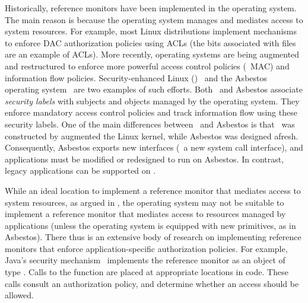 Historically, reference monitors have been implemented in the operating system.
The main reason is because the operating system manages and mediates access to
system resources. For example, most Linux distributions implement mechanisms to
enforce DAC authorization policies using ACLs (the  bits associated
with files are an example of ACLs). More recently, operating systems are being
augmented and restructured to enforce more powerful access control policies
(\eg~MAC) and information flow policies. Security-enhanced Linux
(\selinux)~\cite{ls01a,ls01b} and the Asbestos operating
system~\cite{ekv+05,kef+05} are two examples of such efforts. Both \selinux\
and Asbestos associate \textit{security labels} with subjects and objects
managed by the operating system. They enforce mandatory access control policies
and track information flow using these security labels. One of the main
differences between \selinux\ and Asbestos is that \selinux\ was constructed by
augmented the Linux kernel, while Asbestos was designed afresh. Consequently,
Asbestos exports new interfaces (\eg~a new system call interface), and
applications must be modified or redesigned to run on Asbestos. In contrast,
legacy applications can be supported on \selinux.

While an ideal location to implement a reference monitor that mediates access
to system resources, as argued in
, the operating
system may not be suitable to implement a reference monitor that mediates
access to resources managed by applications (unless the operating system is
equipped with new primitives, as in Asbestos). There thus is an extensive body
of research on implementing reference monitors that enforce
application-specific authorization policies. For example, Java's security
mechanism~\cite{ge03} implements the reference monitor as an object of type
\code{AccessController}. Calls to the function
 are placed at appropriate locations
in code. These calls consult an authorization policy, and determine whether an
access should be allowed.

